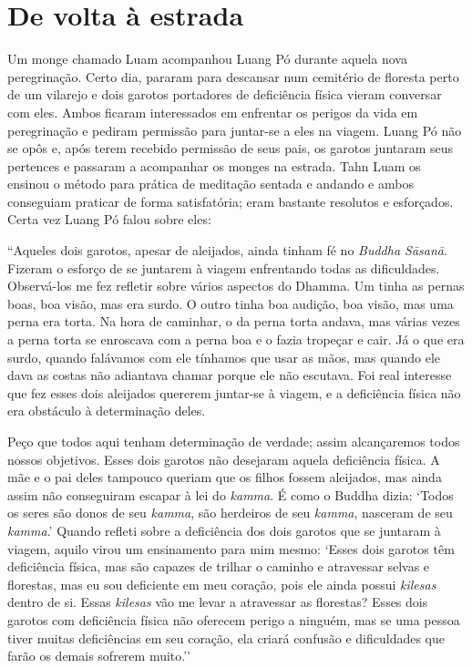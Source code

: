 \chapter{De volta à estrada}

Um monge chamado Luam acompanhou Luang Pó durante aquela nova
peregrinação. Certo dia, pararam para descansar num cemitério de
floresta perto de um vilarejo e dois garotos portadores de deficiência
física vieram conversar com eles. Ambos ficaram interessados em
enfrentar os perigos da vida em peregrinação e pediram permissão para
juntar-se a eles na viagem. Luang Pó não se opôs e, após terem recebido
permissão de seus pais, os garotos juntaram seus pertences e passaram a
acompanhar os monges na estrada. Tahn Luam os ensinou o método para
prática de meditação sentada e andando e ambos conseguiam praticar de
forma satisfatória; eram bastante resolutos e esforçados. Certa vez
Luang Pó falou sobre eles:

``Aqueles dois garotos, apesar de aleijados, ainda tinham fé no
\emph{Buddha Sāsanā}. Fizeram o esforço de se juntarem à viagem
enfrentando todas as dificuldades. Observá-los me fez refletir sobre
vários aspectos do Dhamma. Um tinha as pernas boas, boa visão, mas era
surdo. O outro tinha boa audição, boa visão, mas uma perna era torta. Na
hora de caminhar, o da perna torta andava, mas várias vezes a perna
torta se enroscava com a perna boa e o fazia tropeçar e cair. Já o que
era surdo, quando falávamos com ele tínhamos que usar as mãos, mas
quando ele dava as costas não adiantava chamar porque ele não escutava.
Foi real interesse que fez esses dois aleijados quererem juntar-se à
viagem, e a deficiência física não era obstáculo à determinação deles.

Peço que todos aqui tenham determinação de verdade; assim alcançaremos
todos nossos objetivos. Esses dois garotos não desejaram aquela
deficiência física. A mãe e o pai deles tampouco queriam que os filhos
fossem aleijados, mas ainda assim não conseguiram escapar à lei do
\emph{kamma}. É como o Buddha dizia: `Todos os seres são donos de seu
\emph{kamma}, são herdeiros de seu \emph{kamma}, nasceram de seu
\emph{kamma}.' Quando refleti sobre a deficiência dos dois garotos que
se juntaram à viagem, aquilo virou um ensinamento para mim mesmo: `Esses
dois garotos têm deficiência física, mas são capazes de trilhar o
caminho e atravessar selvas e florestas, mas eu sou deficiente em meu
coração, pois ele ainda possui \emph{kilesas} dentro de si. Essas
\emph{kilesas} vão me levar a atravessar as florestas? Esses dois
garotos com deficiência física não oferecem perigo a ninguém, mas se uma
pessoa tiver muitas deficiências em seu coração, ela criará confusão e
dificuldades que farão os demais sofrerem muito.''

